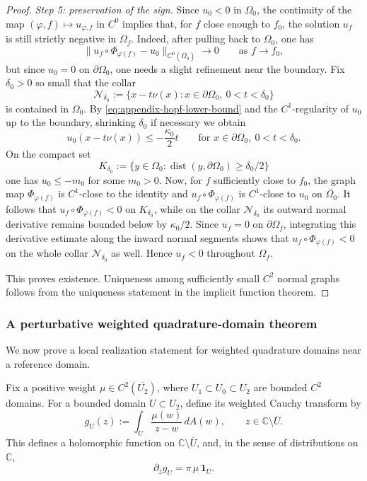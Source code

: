 \documentclass[a4paper,11pt,reqno]{amsart}
\numberwithin{equation}{section}
\theoremstyle{plain} %
\theoremstyle{definition} %
\theoremstyle{remark}
\newcommand{\C}{\mathbb{C}}
\begin{document}
\begin{proof}
\medskip
\noindent\emph{Step 5: preservation of the sign.}
Since \(u_0<0\) in \(\Omega_0\), the continuity of the map
\((\varphi,f)\mapsto u_{\varphi,f}\) in \(C^0\) implies that, for \(f\) close
enough to \(f_0\), the solution \(u_f\) is still strictly negative in
\(\Omega_f\). Indeed, after pulling back to \(\Omega_0\), one has
\[
\|u_f\circ \Phi_{\varphi(f)}-u_0\|_{C^0(\overline{\Omega_0})}\to 0
\qquad \text{as } f\to f_0,
\]
but since \(u_0=0\) on \(\partial\Omega_0\), one needs a slight refinement near
the boundary. Fix \(\delta_0>0\) so small that the collar
\[
\mathcal N_{\delta_0}:=\{x-t\nu(x):x\in \partial\Omega_0,\ 0<t<\delta_0\}
\]
is contained in \(\Omega_0\). By \eqref{eq:appendix-hopf-lower-bound} and the
\(C^{1}\)-regularity of \(u_0\) up to the boundary, shrinking \(\delta_0\) if
necessary we obtain
\[
u_0(x-t\nu(x))\le -\frac{\kappa_0}{2}t
\qquad
\text{for }x\in \partial\Omega_0,\ 0<t<\delta_0.
\]
On the compact set
\[
K_{\delta_0}:=\{y\in \Omega_0:\operatorname{dist}(y,\partial\Omega_0)\ge \delta_0/2\}
\]
one has \(u_0\le -m_0\) for some \(m_0>0\). Now, for \(f\) sufficiently close
to \(f_0\), the graph map \(\Phi_{\varphi(f)}\) is \(C^1\)-close to the
identity and \(u_f\circ \Phi_{\varphi(f)}\) is \(C^1\)-close to \(u_0\) on
\(\overline{\Omega_0}\). It follows that \(u_f\circ \Phi_{\varphi(f)}<0\) on
\(K_{\delta_0}\), while on the collar \(\mathcal N_{\delta_0}\) its outward
normal derivative remains bounded below by \(\kappa_0/2\). Since
\(u_f=0\) on \(\partial\Omega_f\), integrating this derivative estimate along
the inward normal segments shows that \(u_f\circ \Phi_{\varphi(f)}<0\) on the
whole collar \(\mathcal N_{\delta_0}\) as well. Hence \(u_f<0\) throughout
\(\Omega_f\).

This proves existence. Uniqueness among sufficiently small \(C^2\) normal graphs
follows from the uniqueness statement in the implicit function theorem.
\end{proof}

\subsubsection{A perturbative weighted quadrature-domain theorem}\label{app:cherednichenko-type}

We now prove a local realization statement for weighted quadrature domains near a
reference domain.

Fix a positive weight \(\mu\in C^2(\overline{U_2})\), where
\(U_1\subset U_0\subset U_2\) are bounded \(C^2\) domains. For a bounded domain
\(U\subset U_2\), define its weighted Cauchy transform by
\[
g_U(z):=\int_U \frac{\mu(w)}{z-w}\,dA(w),
\qquad z\in \C\setminus \overline U.
\]
This defines a holomorphic function on $\C\setminus \overline U$, and, in the sense of distributions on $\C$,
\[
\partial_{\overline z} g_U = \pi\,\mu\,\mathbf{1}_U.
\]
\end{document}
